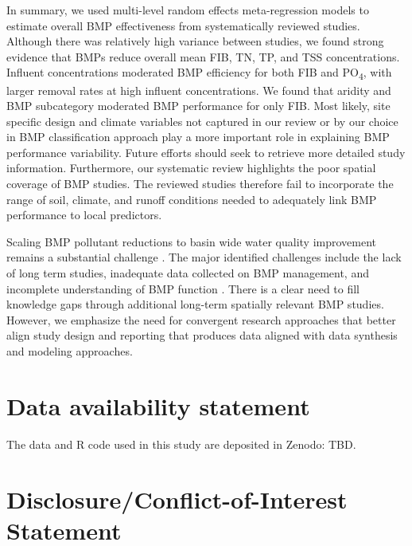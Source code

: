 \documentclass[utf8]{FrontiersinHarvard}
\begin{document}
In summary, we used multi-level random effects meta-regression models to estimate overall BMP effectiveness from systematically reviewed studies.
Although there was relatively high variance between studies, we found strong evidence that BMPs reduce overall mean FIB, TN, TP, and TSS concentrations.
Influent concentrations moderated BMP efficiency for both FIB and PO\textsubscript{4}, with larger removal rates at high influent concentrations.
We found that aridity and BMP subcategory moderated BMP performance for only FIB.
Most likely, site specific design and climate variables not captured in our review or by our choice in BMP classification approach play a more important role in explaining BMP performance variability.
Future efforts should seek to retrieve more detailed study information.
Furthermore, our systematic review highlights the poor spatial coverage of BMP studies.
The reviewed studies therefore fail to incorporate the range of soil, climate, and runoff conditions needed to adequately link BMP performance to local predictors.

Scaling BMP pollutant reductions to basin wide water quality improvement remains a substantial challenge \citep{tomerChallengeDocumentingWater2011, mellandEffectsAgriculturalLand2018, mealsLagTimeWater2010}.
The major identified challenges include the lack of long term studies, inadequate data collected on BMP management, and incomplete understanding of BMP function \citep{linternBestManagementPractices2020, liuReviewEffectivenessBest2017}.
There is a clear need to fill knowledge gaps through additional long-term spatially relevant BMP studies.
However, we emphasize the need for convergent research approaches that better align study design and reporting that produces data aligned with data synthesis and modeling approaches.

\hypertarget{data-availability-statement}{%
\section*{Data availability statement}\label{data-availability-statement}}

The data and R code used in this study are deposited in Zenodo: TBD.

\hypertarget{disclosureconflict-of-interest-statement}{%
\section*{Disclosure/Conflict-of-Interest Statement}\label{disclosureconflict-of-interest-statement}}
\end{document}
